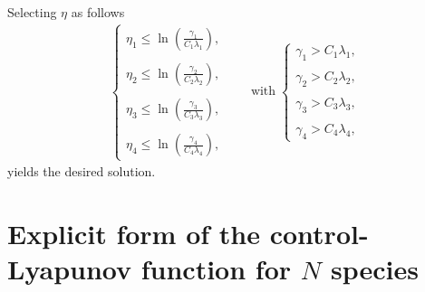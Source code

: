 \documentclass[10pt, a4paper]{amsart}
\makeatletter
\theoremstyle{plain}
\theoremstyle{definition}
\theoremstyle{remark}
\renewenvironment{proof}[1][\proofname]{\par
  \pushQED{\qed}%
  \normalfont \topsep6\p@\@plus6\p@\relax
  \trivlist
  \item[\hskip\labelsep
        \itshape
    #1\ \ref{#1}.]\ignorespaces
}{%
  \popQED\endtrivlist\@endpefalse
}
\numberwithin{equation}{section}
\makeatother
\begin{document}
\begin{proof}[of Proposition \ref{proposition3.18}]
Selecting  $\eta$ as follows
\begin{align}
\begin{cases}
\eta_1\leq \ln\left(\frac{\gamma_1}{C_1\lambda_1}\right),\\
\\\eta_2\leq \ln\left(\frac{\gamma_2}{C_2\lambda_2}\right),\\
\\\eta_3\leq \ln\left(\frac{\gamma_3}{C_3\lambda_3}\right),\\
\\\eta_4\leq \ln\left(\frac{\gamma_4}{C_4\lambda_4}\right),
\end{cases}\qquad\text{with}\; \begin{cases}
\gamma_1>C_1\lambda_1,\\
\\\gamma_2>C_2\lambda_2,\\
\\\gamma_3>C_3\lambda_3,\\
\\\gamma_4>C_4\lambda_4,
\end{cases}
\end{align}
yields the desired solution. %
\end{proof}
\section{\bf Explicit form of the control-Lyapunov function for \texorpdfstring{$N$}{N} species}\label{annexe:B}
\end{document}
